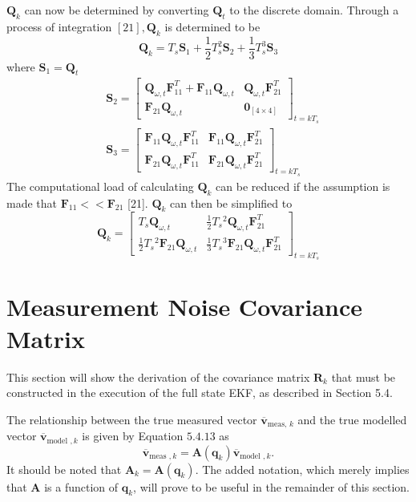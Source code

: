 $\mathbf{Q}_{k}$ can now be determined by converting $\mathbf{Q}_{t}$ to the discrete domain. Through a process of integration $[21], \mathbf{Q}_{k}$ is determined to be
$$
\mathbf{Q}_{k}=T_{s} \mathbf{S}_{1}+\frac{1}{2} T_{s}^{2} \mathbf{S}_{2}+\frac{1}{3} T_{s}^{3} \mathbf{S}_{3}
$$
where $\mathbf{S}_{1}=\mathbf{Q}_{t}$
$$
\begin{aligned}
&\mathbf{S}_{2}=\left[\begin{array}{cc}
\mathbf{Q}_{\omega, t} \mathbf{F}_{11}^{T}+\mathbf{F}_{11} \mathbf{Q}_{\omega, t} & \mathbf{Q}_{\omega, t} \mathbf{F}_{21}^{T} \\
\mathbf{F}_{21} \mathbf{Q}_{\omega, t} & \mathbf{0}_{[4 \times 4]}
\end{array}\right]_{t=k T_{s}} \\
&\mathbf{S}_{3}=\left[\begin{array}{ll}
\mathbf{F}_{11} \mathbf{Q}_{\omega, t} \mathbf{F}_{11}^{T} & \mathbf{F}_{11} \mathbf{Q}_{\omega, t} \mathbf{F}_{21}^{T} \\
\mathbf{F}_{21} \mathbf{Q}_{\omega, t} \mathbf{F}_{11}^{T} & \mathbf{F}_{21} \mathbf{Q}_{\omega, t} \mathbf{F}_{21}^{T}
\end{array}\right]_{t=k T_{s}}
\end{aligned}
$$
The computational load of calculating $\mathbf{Q}_{k}$ can be reduced if the assumption is made that $\mathbf{F}_{11}<<\mathbf{F}_{21}$ [21]. $\mathbf{Q}_{k}$ can then be simplified to
$$
\mathbf{Q}_{k}=\left[\begin{array}{cc}
T_{s} \mathbf{Q}_{\omega, t} & \frac{1}{2} T_{s}{ }^{2} \mathbf{Q}_{\omega, t} \mathbf{F}_{21}^{T} \\
\frac{1}{2} T_{s}{ }^{2} \mathbf{F}_{21} \mathbf{Q}_{\omega, t} & \frac{1}{3} T_{s}{ }^{3} \mathbf{F}_{21} \mathbf{Q}_{\omega, t} \mathbf{F}_{21}^{T}
\end{array}\right]_{t=k T_{s}}
$$

\chapter{Measurement Noise Covariance Matrix}
\makeatletter{}\makeatother
\label{chap:Measurement Noise Covariance Matrix}
This section will show the derivation of the covariance matrix $\mathbf{R}_{k}$ that must be constructed in the execution of the full state EKF, as described in Section 5.4.

The relationship between the true measured vector $\overline{\mathbf{v}}_{\text {meas, } k}$ and the true modelled vector $\overline{\mathbf{v}}_{\text {model }, k}$ is given by Equation $5.4 .13$ as
$$
\overline{\mathbf{v}}_{\text {meas }, k}=\mathbf{A}\left(\mathbf{q}_{k}\right) \overline{\mathbf{v}}_{\text {model }, k} .
$$
It should be noted that $\mathbf{A}_{k}=\mathbf{A}\left(\mathbf{q}_{k}\right)$. The added notation, which merely implies that $\mathbf{A}$ is a function of $\mathbf{q}_{k}$, will prove to be useful in the remainder of this section.

